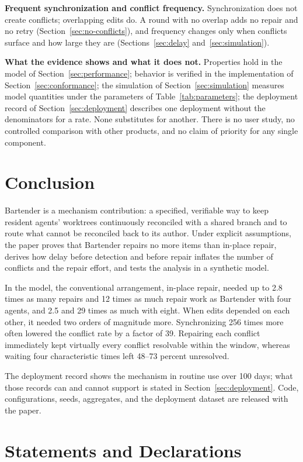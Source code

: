 \documentclass[pdflatex,sn-mathphys-ay]{sn-jnl}
\theoremstyle{thmstyleone}
\theoremstyle{thmstylethree}
\begin{document}
\textbf{Frequent synchronization and conflict frequency.} Synchronization does not create conflicts; overlapping edits do. A round with no overlap adds no repair and no retry (Section~\ref{sec:no-conflicts}), and frequency changes only when conflicts surface and how large they are (Sections~\ref{sec:delay} and~\ref{sec:simulation}).

\textbf{What the evidence shows and what it does not.} Properties hold in the model of Section~\ref{sec:performance}; behavior is verified in the implementation of Section~\ref{sec:conformance}; the simulation of Section~\ref{sec:simulation} measures model quantities under the parameters of Table~\ref{tab:parameters}; the deployment record of Section~\ref{sec:deployment} describes one deployment without the denominators for a rate. None substitutes for another. There is no user study, no controlled comparison with other products, and no claim of priority for any single component.
\section{Conclusion}\label{sec:conclusion}

Bartender is a mechanism contribution: a specified, verifiable way to keep resident agents' worktrees continuously reconciled with a shared branch and to route what cannot be reconciled back to its author. Under explicit assumptions, the paper proves that Bartender repairs no more items than in-place repair, derives how delay before detection and before repair inflates the number of conflicts and the repair effort, and tests the analysis in a synthetic model.

In the model, the conventional arrangement, in-place repair, needed up to 2.8 times as many repairs and 12 times as much repair work as Bartender with four agents, and 2.5 and 29 times as much with eight. When edits depended on each other, it needed two orders of magnitude more. Synchronizing 256 times more often lowered the conflict rate by a factor of 39. Repairing each conflict immediately kept virtually every conflict resolvable within the window, whereas waiting four characteristic times left 48--73 percent unresolved.

The deployment record shows the mechanism in routine use over 100 days; what those records can and cannot support is stated in Section~\ref{sec:deployment}. Code, configurations, seeds, aggregates, and the deployment dataset are released with the paper.
\section*{Statements and Declarations}
\end{document}
